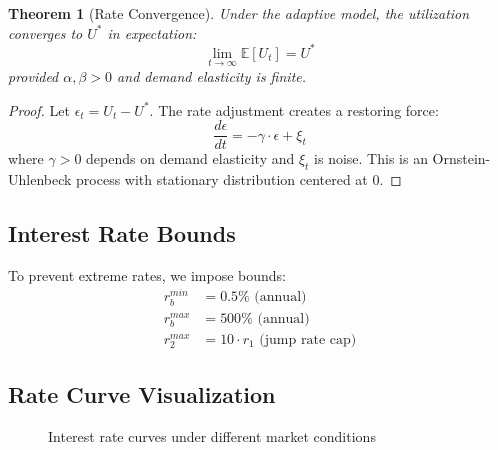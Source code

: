 \documentclass[11pt,a4paper]{article}
\newtheorem{theorem}{Theorem}
\begin{document}
\begin{theorem}[Rate Convergence]
Under the adaptive model, the utilization converges to $U^*$ in expectation:
\begin{equation}
    \lim_{t \to \infty} \mathbb{E}[U_t] = U^*
\end{equation}
provided $\alpha, \beta > 0$ and demand elasticity is finite.
\end{theorem}

\begin{proof}
Let $\epsilon_t = U_t - U^*$. The rate adjustment creates a restoring force:
\begin{equation}
    \frac{d\epsilon}{dt} = -\gamma \cdot \epsilon + \xi_t
\end{equation}
where $\gamma > 0$ depends on demand elasticity and $\xi_t$ is noise. This is an Ornstein-Uhlenbeck process with stationary distribution centered at 0.
\end{proof}

\subsection{Interest Rate Bounds}

To prevent extreme rates, we impose bounds:
\begin{align}
    r_b^{min} &= 0.5\% \text{ (annual)} \\
    r_b^{max} &= 500\% \text{ (annual)} \\
    r_2^{max} &= 10 \cdot r_1 \text{ (jump rate cap)}
\end{align}

\subsection{Rate Curve Visualization}

\begin{figure}[h]
\centering
{}
\caption{Interest rate curves under different market conditions}
\label{fig:rate_curves}
\end{figure}
\end{document}
